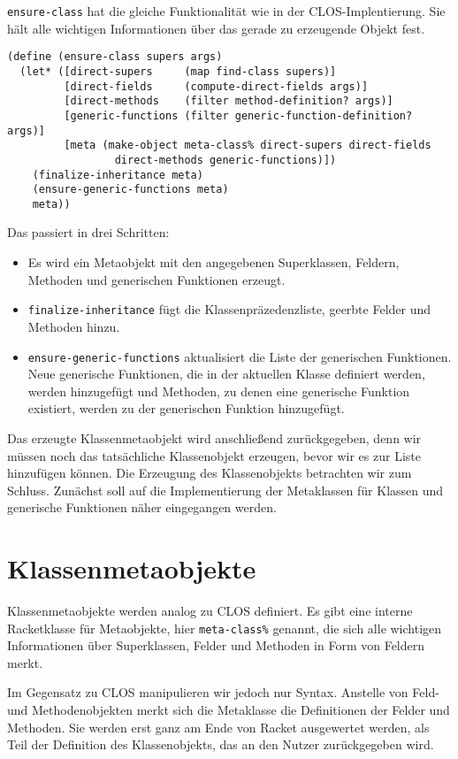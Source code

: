 \texttt{ensure-class} hat die gleiche Funktionalität wie in der CLOS-Implentierung. Sie hält alle wichtigen Informationen über das gerade zu erzeugende Objekt fest. 

\begin{lstlisting}
(define (ensure-class supers args)
  (let* ([direct-supers     (map find-class supers)]  
         [direct-fields     (compute-direct-fields args)]
         [direct-methods    (filter method-definition? args)]
         [generic-functions (filter generic-function-definition? args)]
         [meta (make-object meta-class% direct-supers direct-fields
                 direct-methods generic-functions)])
    (finalize-inheritance meta)
    (ensure-generic-functions meta)
    meta))
\end{lstlisting}


Das passiert in drei Schritten:
\begin{itemize}
 \item Es wird ein Metaobjekt mit den angegebenen Superklassen, Feldern, Methoden und generischen Funktionen erzeugt.
 \item \texttt{finalize-inheritance} fügt die Klassenpräzedenzliste, geerbte Felder und Methoden hinzu.
 \item \texttt{ensure-generic-functions} aktualisiert die Liste der generischen Funktionen. Neue generische Funktionen, die in der aktuellen Klasse definiert werden, werden hinzugefügt und Methoden, zu denen eine generische Funktion existiert, werden zu der generischen Funktion hinzugefügt.
\end{itemize}

Das erzeugte Klassenmetaobjekt wird anschließend zurückgegeben, denn wir müssen noch das tatsächliche Klassenobjekt erzeugen, bevor wir es zur Liste hinzufügen können. Die Erzeugung des Klassenobjekts betrachten wir zum Schluss. Zunächst soll auf die Implementierung der Metaklassen für Klassen und generische Funktionen näher eingegangen werden.

\section{Klassenmetaobjekte}
Klassenmetaobjekte werden analog zu CLOS definiert. Es gibt eine interne Racketklasse für Metaobjekte, hier \texttt{meta-class\%} genannt, die sich alle wichtigen Informationen über Superklassen, Felder und Methoden in Form von Feldern merkt.

Im Gegensatz zu CLOS manipulieren wir jedoch nur Syntax. Anstelle von Feld- und Methodenobjekten merkt sich die Metaklasse die Definitionen der Felder und Methoden. Sie werden erst ganz am Ende von Racket ausgewertet werden, als Teil der Definition des Klassenobjekts, das an den Nutzer zurückgegeben wird.


